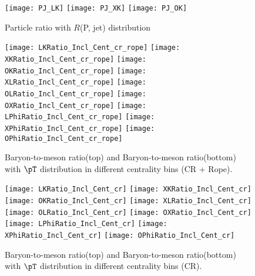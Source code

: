 \begin{figure}[ht]
	\begin{center}
		\texttt{[image: PJ\_LK]}
		\texttt{[image: PJ\_XK]}
		\texttt{[image: PJ\_OK]}
	\end{center}
	\caption{Particle ratio with $R$(P, jet) distribution}
	\label{fig:ParRatiotoJet}
\end{figure}


\begin{figure}[ht]
        \begin{center}
                \texttt{[image: LKRatio\_Incl\_Cent\_cr\_rope]}
                \texttt{[image: XKRatio\_Incl\_Cent\_cr\_rope]}
                \texttt{[image: OKRatio\_Incl\_Cent\_cr\_rope]}
                \texttt{[image: XLRatio\_Incl\_Cent\_cr\_rope]}
                \texttt{[image: OLRatio\_Incl\_Cent\_cr\_rope]}
                \texttt{[image: OXRatio\_Incl\_Cent\_cr\_rope]}
                \texttt{[image: LPhiRatio\_Incl\_Cent\_cr\_rope]}
                \texttt{[image: XPhiRatio\_Incl\_Cent\_cr\_rope]}
                \texttt{[image: OPhiRatio\_Incl\_Cent\_cr\_rope]}
        \end{center}
	\caption{Baryon-to-meson ratio(top) and Baryon-to-meson ratio(bottom) with $\pT$ distribution in different centrality bins (CR + Rope).}
        \label{fig:InclParRatioCentcrandrope}
\end{figure}

\begin{figure}[ht]
	\begin{center}
		\texttt{[image: LKRatio\_Incl\_Cent\_cr]}
		\texttt{[image: XKRatio\_Incl\_Cent\_cr]}
		\texttt{[image: OKRatio\_Incl\_Cent\_cr]}
		\texttt{[image: XLRatio\_Incl\_Cent\_cr]}
		\texttt{[image: OLRatio\_Incl\_Cent\_cr]}
		\texttt{[image: OXRatio\_Incl\_Cent\_cr]}
                \texttt{[image: LPhiRatio\_Incl\_Cent\_cr]}
                \texttt{[image: XPhiRatio\_Incl\_Cent\_cr]}
                \texttt{[image: OPhiRatio\_Incl\_Cent\_cr]}
	\end{center}
	\caption{Baryon-to-meson ratio(top) and Baryon-to-meson ratio(bottom) with $\pT$ distribution in different centrality bins (CR).}
	\label{fig:InclParRatioCentcr}
\end{figure}

